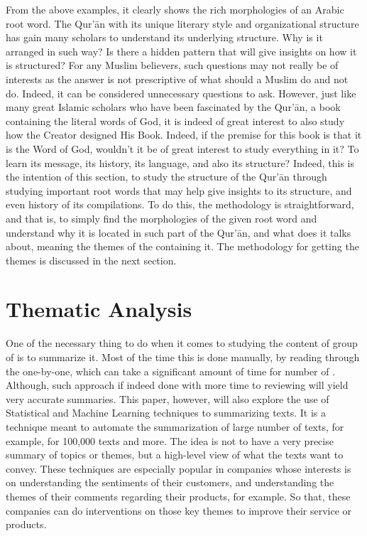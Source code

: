 From the above examples, it clearly shows the rich morphologies of an Arabic root word. The Qur'\=an with its unique literary style and organizational structure has gain many scholars to understand its underlying structure. Why is it arranged in such way? Is there a hidden pattern that will give insights on how it is structured? For any Muslim believers, such questions may not really be of interests as the answer is not prescriptive of what should a Muslim do and not do. Indeed, it can be considered unnecessary questions to ask. However, just like many great Islamic scholars who have been fascinated by the Qur'\=an, a book containing the literal words of God, it is indeed of great interest to also study how the Creator designed His Book. Indeed, if the premise for this book is that it is the Word of God, wouldn't it be of great interest to study everything in it? To learn its message, its history, its language, and also its structure? Indeed, this is the intention of this section, to study the structure of the Qur'\=an through studying important root words that may help give insights to its structure, and even history of its compilations. To do this, the methodology is straightforward, and that is, to simply find the morphologies of the given root word and understand why it is located in such part of the Qur'\=an, and what does it talks about, meaning the themes of the   containing it. The methodology for getting the themes is discussed in the next section.
\section{Thematic Analysis}\label{sec:method_thematic_analysis}
One of the necessary thing to do when it comes to studying the content of group of   is to summarize it. Most of the time this is done manually, by reading through the   one-by-one, which can take a significant amount of time for number of  . Although, such approach if indeed done with more time to reviewing will yield very accurate summaries. This paper, however, will also explore the use of Statistical and Machine Learning techniques to summarizing texts. It is a technique meant to automate the summarization of large number of texts, for example, for 100,000 texts and more. The idea is not to have a very precise summary of topics or themes, but a high-level view of what the texts want to convey. These techniques are especially popular in companies whose interests is on understanding the sentiments of their customers, and understanding the themes of their comments regarding their products, for example. So that, these companies can do interventions on those key themes to improve their service or products.

